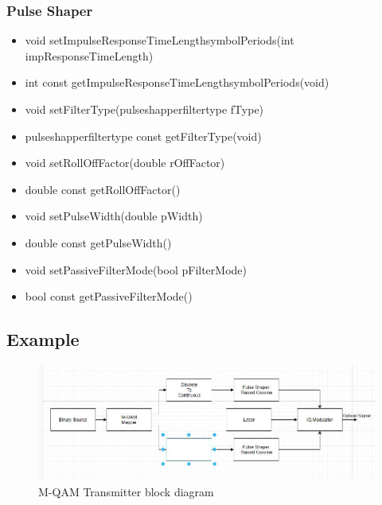 \subsubsection{Pulse Shaper}
\begin{itemize}
\item void setImpulseResponseTimeLength\textunderscore symbolPeriods(int impResponseTimeLength)
\item int const getImpulseResponseTimeLength\textunderscore symbolPeriods(void)
\item void setFilterType(pulse\textunderscore shapper\textunderscore filter\textunderscore type fType)
\item pulse\textunderscore shapper\textunderscore filter\textunderscore type const getFilterType(void)
\item void setRollOffFactor(double rOffFactor)
\item double const getRollOffFactor()
\item void setPulseWidth(double pWidth)
\item double const getPulseWidth()
\item void setPassiveFilterMode(bool pFilterMode)
\item bool const getPassiveFilterMode()
\end{itemize}
\pagebreak
\subsection*{Example}
\begin{figure}[H]
	\centering
	\includegraphics[scale=0.6]{../lib/m_qam_transmitter/figures/Transmitter_diagram.png}
	\caption{M-QAM Transmitter block diagram}
	\label{fig:trasmitter diagram}
\end{figure}

